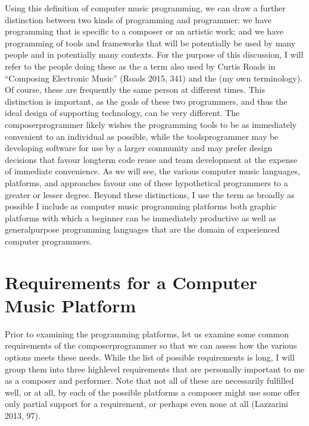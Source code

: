 \documentclass[letterpaper,10pt,english]{sphinxmanual}
\begin{document}
\sphinxAtStartPar
Using this definition of computer music programming, we can draw a further distinction
between two kinds of programming and programmer:
we have programming that is specific to a composer or an artistic work;
and we have programming of tools and frameworks that will be potentially be used by many
people and in potentially many contexts.
For the purpose of this discussion, I will refer to the people doing these as the 
\sphinxhyphen{} a term also used by Curtis Roads in “Composing Electronic Music” (Roads 2015, 341) \sphinxhyphen{}
and the  (my own terminology).
Of course, these are frequently the same person at different times.
This distinction is important, as the goals of these two programmers, and thus the
ideal design of supporting technology, can be very different.
The composer\sphinxhyphen{}programmer likely wishes the programming tools to be as immediately convenient
to an individual as possible, while the tools\sphinxhyphen{}programmer may be
developing software for use by a larger community and may prefer design decisions
that favour long\sphinxhyphen{}term code reuse and team development at the expense of immediate convenience.
As we will see, the various computer music languages, platforms, and approaches
favour one of these hypothetical programmers to a greater or lesser degree.
Beyond these distinctions, I use the term  as broadly
as possible \sphinxhyphen{} I include as computer music programming platforms both graphic platforms with
which a beginner can be immediately productive as well as general\sphinxhyphen{}purpose programming
languages that are the domain of experienced computer programmers.


\section{Requirements for a Computer Music Platform}
\label{\detokenize{background:requirements-for-a-computer-music-platform}}
\sphinxAtStartPar
Prior to examining the programming platforms, let us examine some
common requirements of the composer\sphinxhyphen{}programmer so that we can assess how the various
options meets these needs.
While the list of possible requirements is long, I will group
them into three high\sphinxhyphen{}level requirements that are personally important to me as
a composer and performer. Note that not all of these are necessarily fulfilled well, or at all,
by each of the possible platforms a composer might use \sphinxhyphen{} some offer
only partial support for a requirement, or perhaps even none at all (Lazzarini 2013, 97).
\end{document}
